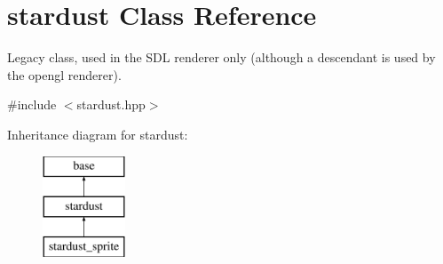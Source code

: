 \hypertarget{classstardust}{\section{stardust Class Reference}
\label{classstardust}
}


Legacy class, used in the S\-D\-L renderer only (although a descendant is used by the opengl renderer).  




{\ttfamily \#include $<$stardust.\-hpp$>$}

Inheritance diagram for stardust\-:\begin{figure}[H]
\begin{center}
\leavevmode
\includegraphics[height=3.000000cm]{classstardust}
\end{center}
\end{figure}

